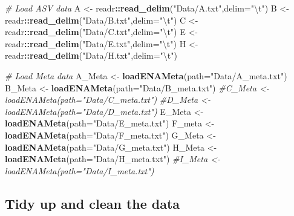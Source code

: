 \documentclass[
]{article}
\newenvironment{Shaded}{\begin{snugshade}}{\end{snugshade}}
\newcommand{\CharTok}[1]{\textcolor[rgb]{0.31,0.60,0.02}{#1}}
\newcommand{\CommentTok}[1]{\textcolor[rgb]{0.56,0.35,0.01}{\textit{#1}}}
\newcommand{\DataTypeTok}[1]{\textcolor[rgb]{0.13,0.29,0.53}{#1}}
\newcommand{\KeywordTok}[1]{\textcolor[rgb]{0.13,0.29,0.53}{\textbf{#1}}}
\newcommand{\NormalTok}[1]{#1}
\newcommand{\OperatorTok}[1]{\textcolor[rgb]{0.81,0.36,0.00}{\textbf{#1}}}
\newcommand{\StringTok}[1]{\textcolor[rgb]{0.31,0.60,0.02}{#1}}
\begin{document}
\begin{Shaded}
\begin{Highlighting}[]
\CommentTok{# Load ASV data}
\NormalTok{A <-}\StringTok{ }\NormalTok{readr}\OperatorTok{::}\KeywordTok{read_delim}\NormalTok{(}\StringTok{"Data/A.txt"}\NormalTok{,}\DataTypeTok{delim=}\StringTok{"}\CharTok{\textbackslash{}t}\StringTok{"}\NormalTok{)}
\NormalTok{B <-}\StringTok{ }\NormalTok{readr}\OperatorTok{::}\KeywordTok{read_delim}\NormalTok{(}\StringTok{"Data/B.txt"}\NormalTok{,}\DataTypeTok{delim=}\StringTok{"}\CharTok{\textbackslash{}t}\StringTok{"}\NormalTok{)}
\NormalTok{C <-}\StringTok{ }\NormalTok{readr}\OperatorTok{::}\KeywordTok{read_delim}\NormalTok{(}\StringTok{"Data/C.txt"}\NormalTok{,}\DataTypeTok{delim=}\StringTok{"}\CharTok{\textbackslash{}t}\StringTok{"}\NormalTok{)}
\NormalTok{E <-}\StringTok{ }\NormalTok{readr}\OperatorTok{::}\KeywordTok{read_delim}\NormalTok{(}\StringTok{"Data/E.txt"}\NormalTok{,}\DataTypeTok{delim=}\StringTok{"}\CharTok{\textbackslash{}t}\StringTok{"}\NormalTok{)}
\NormalTok{H <-}\StringTok{ }\NormalTok{readr}\OperatorTok{::}\KeywordTok{read_delim}\NormalTok{(}\StringTok{"Data/H.txt"}\NormalTok{,}\DataTypeTok{delim=}\StringTok{"}\CharTok{\textbackslash{}t}\StringTok{"}\NormalTok{)}

\CommentTok{# Load Meta data}
\NormalTok{A_Meta <-}\StringTok{ }\KeywordTok{loadENAMeta}\NormalTok{(}\DataTypeTok{path=}\StringTok{"Data/A_meta.txt"}\NormalTok{)}
\NormalTok{B_Meta <-}\StringTok{ }\KeywordTok{loadENAMeta}\NormalTok{(}\DataTypeTok{path=}\StringTok{"Data/B_meta.txt"}\NormalTok{)}
\CommentTok{#C_Meta <- loadENAMeta(path="Data/C_meta.txt")}
\CommentTok{#D_Meta <- loadENAMeta(path="Data/D_meta.txt")}
\NormalTok{E_Meta <-}\StringTok{ }\KeywordTok{loadENAMeta}\NormalTok{(}\DataTypeTok{path=}\StringTok{"Data/E_meta.txt"}\NormalTok{)}
\NormalTok{F_meta <-}\StringTok{ }\KeywordTok{loadENAMeta}\NormalTok{(}\DataTypeTok{path=}\StringTok{"Data/F_meta.txt"}\NormalTok{)}
\NormalTok{G_Meta <-}\StringTok{ }\KeywordTok{loadENAMeta}\NormalTok{(}\DataTypeTok{path=}\StringTok{"Data/G_meta.txt"}\NormalTok{)}
\NormalTok{H_Meta <-}\StringTok{ }\KeywordTok{loadENAMeta}\NormalTok{(}\DataTypeTok{path=}\StringTok{"Data/H_meta.txt"}\NormalTok{)}
\CommentTok{#I_Meta <- loadENAMeta(path="Data/I_meta.txt")}
\end{Highlighting}
\end{Shaded}

\hypertarget{tidy-up-and-clean-the-data}{%
\subsection{Tidy up and clean the
data}\label{tidy-up-and-clean-the-data}}
\end{document}
